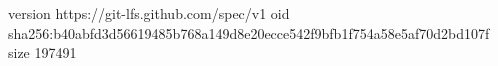 version https://git-lfs.github.com/spec/v1
oid sha256:b40abfd3d56619485b768a149d8e20ecce542f9bfb1f754a58e5af70d2bd107f
size 197491
